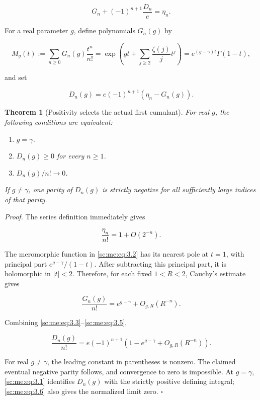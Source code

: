 \documentclass[11pt,a4paper]{article}
\providecommand{\tightlist}{\setlength{\itemsep}{0pt}\setlength{\parskip}{0pt}}
\newtheorem{theorem}{Theorem}[section]
\theoremstyle{definition}
\theoremstyle{remark}
\theoremstyle{plain}
\numberwithin{equation}{section}
\begin{document}
\[
G_n+(-1)^{n+1}\frac{D_n}{e}=\eta_n.
\tag{ME.3.1}\label{sc:me:eq:3.1}
\]

For a real parameter \(g\), define polynomials \(G_n(g)\) by

\[
M_g(t):=\sum_{n\ge0}G_n(g)\frac{t^n}{n!}
=\exp\left(gt+\sum_{j\ge2}\frac{\zeta(j)}j t^j\right)
=e^{(g-\gamma)t}\Gamma(1-t),
\tag{ME.3.2}\label{sc:me:eq:3.2}
\]

and set

\[
D_n(g)=e(-1)^{n+1}(\eta_n-G_n(g)).
\tag{ME.3.3}\label{sc:me:eq:3.3}
\]

\begin{theorem}[Positivity selects the actual first cumulant]\label{sc:me:positivity} For real \(g\), the following conditions are
equivalent:

\begin{enumerate}
\def\labelenumi{\arabic{enumi}.}
\tightlist
\item
  \(g=\gamma\).
\item
  \(D_n(g)\ge0\) for every \(n\ge1\).
\item
  \(D_n(g)/n!\to0\).
\end{enumerate}

If \(g\ne\gamma\), one parity of \(D_n(g)\) is strictly negative for all
sufficiently large indices of that parity.

\end{theorem}
\emph{Proof.} The series definition immediately gives

\[
\frac{\eta_n}{n!}=1+O(2^{-n}).
\tag{ME.3.4}\label{sc:me:eq:3.4}
\]

The meromorphic function in \eqref{sc:me:eq:3.2} has its nearest pole at \(t=1\), with
principal part \(e^{g-\gamma}/(1-t)\). After subtracting this principal
part, it is holomorphic in \(|t|<2\). Therefore, for each fixed
\(1<R<2\), Cauchy's estimate gives

\[
\frac{G_n(g)}{n!}=e^{g-\gamma}+O_{g,R}(R^{-n}).
\tag{ME.3.5}\label{sc:me:eq:3.5}
\]

Combining \eqref{sc:me:eq:3.3}--\eqref{sc:me:eq:3.5},

\[
\frac{D_n(g)}{n!}
=e(-1)^{n+1}\left(1-e^{g-\gamma}+O_{g,R}(R^{-n})\right).
\tag{ME.3.6}\label{sc:me:eq:3.6}
\]

For real \(g\ne\gamma\), the leading constant in parentheses is nonzero.
The claimed eventual negative parity follows, and convergence to zero is
impossible. At \(g=\gamma\), \eqref{sc:me:eq:3.1} identifies \(D_n(g)\) with the
strictly positive defining integral; \eqref{sc:me:eq:3.6} also gives the normalized
limit zero. \(\square\)
\end{document}
